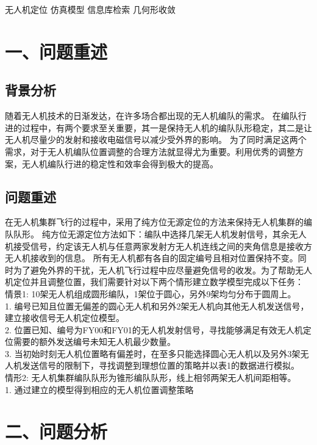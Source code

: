 \documentclass{my_paper}
\begin{document}
\begin{guanjianci}
无人机定位 \quad 仿真模型 \quad 信息库检索 \quad 几何形收敛
\end{guanjianci}

\newpage
\section{一、问题重述}
\subsection{背景分析}
随着无人机技术的日渐发达，在许多场合都出现的无人机编队的需求\cite{baca2021mrs}。
在编队行进的过程中，有两个要求至关重要，其一是保持无人机的编队队形稳定，其二是让无人机尽量少的发射和接收电磁信号以减少受外界的影响。
为了同时满足这两个需求，对于无人机编队位置调整的合理方法就显得尤为重要。利用优秀的调整方案，无人机编队行进的稳定性和效率会得到极大的提高。\cite{santos2017indoor}
\subsection{问题重述}
在无人机集群飞行的过程中，采用了纯方位无源定位的方法来保持无人机集群的编队队形。
纯方位无源定位方法如下：编队中选择几架无人机发射信号，其余无人机接受信号，约定该无人机与任意两家发射方无人机连线之间的夹角信息是接收方无人机接收到的信息。
所有无人机都有各自的固定编号且相对位置保持不变。同时为了避免外界的干扰，无人机飞行过程中应尽量避免信号的收发。为了帮助无人机定位并且调整位置，我们需要针对以下两个情形建立数学模型完成以下任务：\\
情景1: 10架无人机组成圆形编队，1架位于圆心，另外9架均匀分布于圆周上。  \\
1. 编号已知且位置无偏差的圆心无人机和另外2架无人机向其他无人机发送信号，建立接收信号无人机定位模型。 \\
2. 位置已知、编号为FY00和FY01的无人机发射信号，寻找能够满足有效无人机定位需要的额外发送编号未知无人机最少数量。 \\
3. 当初始时刻无人机位置略有偏差时，在至多只能选择圆心无人机以及另外3架无人机发送信号的限制下，寻找调整到理想位置的策略并以表1的数据进行模拟。 \\
情形2: 无人机集群编队队形为锥形编队队形，线上相邻两架无人机间距相等。 \\
1. 通过建立的模型得到相应的无人机位置调整策略

\section{二、问题分析}
\end{document}
